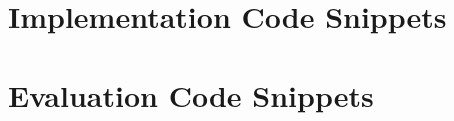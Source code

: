 \chapter{Implementation Code Snippets} \label{chap:app-code}

\chapter{Evaluation Code Snippets} \label{chap:app:evaluation}
